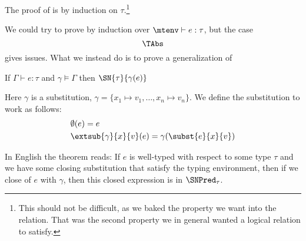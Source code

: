 The proof of  is by induction on $\tau$.\footnote{This should not be difficult, as we baked the property we want into the relation. That was the second property we in general wanted a logical relation to satisfy.}

We could try to prove  by induction over $\mtenv \vdash e : \tau$, but the case
\[
  \TAbs
\]
gives issues. What we instead do is to prove a generalization of 
\begin{astrnorm}
  If $\Gamma \vdash e : \tau$ and $\gamma \models \Gamma$ then $\SN{\tau}{\gamma(e)}$
\end{astrnorm}
Here $\gamma$ is a substitution, $\gamma = \{x_1 \mapsto v_1, \dots , x_n \mapsto v_n\}$. We define the substitution to work as follows:
\begin{align*}
  & \emptyset (e) = e \\
  & \extsub{\gamma}{x}{v}(e) = \gamma(\subst{e}{x}{v})
\end{align*}

In English the theorem reads: If $e$ is well-typed with respect to some type $\tau$ and we have some closing substitution that satisfy the typing environment, then if we close of $e$ with $\gamma$, then this closed expression is in $\SNPred_\tau$.

